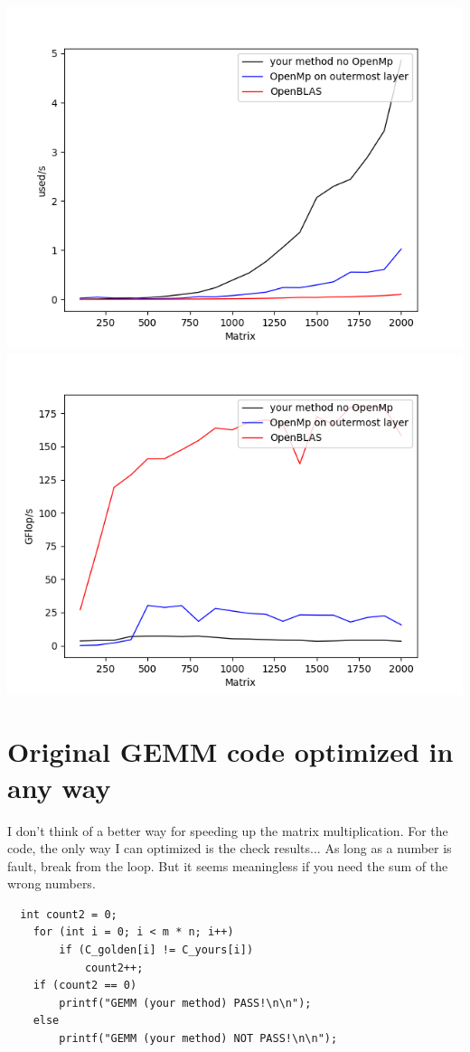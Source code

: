 \documentclass[12pt]{article}
\begin{document}
\includegraphics[scale=0.5]{4s}
\includegraphics[scale=0.5]{4g}

\section{Original GEMM code optimized in any way}

I don't think of a better way for speeding up the matrix multiplication.
For the code, the only way I can optimized is the check results... As long as a number is fault, break from the loop.
But it seems meaningless if you need the sum of the wrong numbers.

\begin{lstlisting}
  int count2 = 0;
    for (int i = 0; i < m * n; i++)
        if (C_golden[i] != C_yours[i])
            count2++;
    if (count2 == 0)
        printf("GEMM (your method) PASS!\n\n");
    else
        printf("GEMM (your method) NOT PASS!\n\n");
\end{lstlisting}
   
\end{document}
